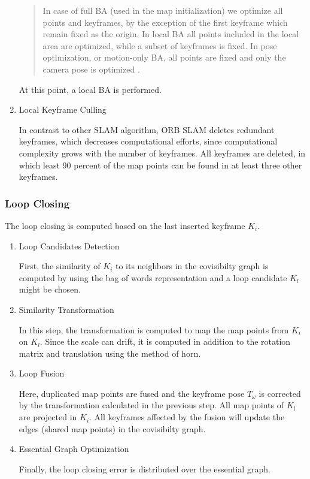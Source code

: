 \begin{enumerate}
	\begin{quote}
	In case of full BA
	(used in the map initialization) we optimize
	all points and keyframes, by the exception of the first
	keyframe which remain fixed as the origin. In local BA
	all points included in the local area
	are optimized, while a subset of keyframes is fixed. In
	pose optimization, or motion-only BA, all
	points are fixed and only the camera pose is optimized \cite{orb} .
	\end{quote}
	At this point, a local BA is performed.
	
	\item{Local Keyframe Culling}
	
	In contrast to other SLAM algorithm, ORB SLAM deletes redundant 
	keyframes, which decreases computational efforts, since computational
	complexity grows with the number of keyframes. All keyframes are deleted, 
	in which least 90 percent of the map points can be found in at least three other 
	keyframes. 
	
	
	\end{enumerate}
	
	\subsubsection{Loop Closing}
	
	The loop closing is computed based on the last inserted keyframe $K_i$. 
	
	\begin{enumerate}
	\item{Loop Candidates Detection}
	
	First, the similarity of $K_i$ to its neighbors in the covisibilty
	graph is computed by using the bag of words representation and a 
	loop candidate $K_l$ might be chosen. 
	
	\item{Similarity Transformation}
	
	In this step, the transformation is computed to map the map points
	from $K_i$ on $K_l$. Since the scale can drift, it is computed
	in addition to the rotation matrix and translation using the method of horn. 
	
	
	\item{Loop Fusion}
	
	Here, duplicated map points are fused and the keyframe pose $T_\omega$ is corrected by the transformation
	calculated in the previous step. All map points of $K_l$ are projected in $K_i$. 
	All keyframes affected by the fusion will update the edges (shared map points) in the 
	covisibilty graph. 
	
	\item{ Essential Graph Optimization}
	
	Finally, the loop closing error is distributed over the essential graph. 
	
	
	\end{enumerate}
	

